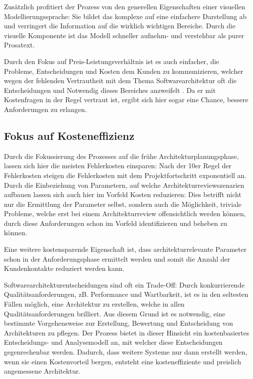 Zusätzlich profitiert der Prozess von den generellen Eigenschaften einer visuellen Modellierungssprache: Sie bildet das komplexe auf eine einfachere Darstellung ab und verringert die Information auf die wirklich wichtigen Bereiche. Durch die visuelle Komponente ist das Modell schneller aufnehm- und verstehbar als purer Prosatext.

Durch den Fokus auf Preis-Leistungsverhältnis ist es auch einfacher, die Probleme, Entscheidungen und Kosten dem Kunden zu kommunizieren, welcher wegen der fehlenden Vertrautheit mit dem Thema Softwarearchitektur oft die Entscheidungen und Notwendig dieses Bereiches anzweifelt \cite[S. 8-9]{softarch}. Da er mit Kostenfragen in der Regel vertraut ist, ergibt sich hier sogar eine Chance, bessere Anforderungen zu erlangen.

\subsection{Fokus auf Kosteneffizienz}
Durch die Fokussierung des Prozesses auf die frühe Architekturplanungsphase, lassen sich hier die meisten Fehlerkosten einsparen: Nach der 10er Regel der Fehlerkosten steigen die Fehlerkosten mit dem Projektfortschritt exponentiell an. Durch die Einbeziehung von Parametern, auf welche  Architekturreviewszenarien aufbauen lassen sich auch hier im Vorfeld Kosten reduzieren: Dies betrifft nicht nur die Ermittlung der Parameter selbst, sondern auch die Möglichkeit, triviale Probleme, welche erst bei einem Architekturreview offensichtlich werden können, durch diese Anforderungen schon im Vorfeld identifizieren und beheben zu können.

Eine weitere kostensparende Eigenschaft ist, dass architekturrelevante Parameter schon in der Anforderungsphase ermittelt werden und somit die Anzahl der Kundenkontakte reduziert werden kann.

Softwarearchitekturentscheidungen sind oft ein Trade-Off: Durch konkurrierende Qualitätsanforderungen, zB. Performance und Wartbarkeit, ist es in den seltesten Fällen möglich, eine Architektur zu erstellen, welche in allen Qualitätsanforderungen brilliert. Aus diesem Grund ist es notwendig, eine bestimmte Vorgehensweise zur Erstellung, Bewertung und Entscheidung von Architekturen zu pflegen. Der Prozess bietet in dieser Hinsicht ein kostenbasiertes Entscheidungs- und Analysemodell an, mit welcher diese Entscheidungen gegenrechenbar werden. Dadurch, dass weitere Systeme nur dann erstellt werden, wenn sie einen Kostenvorteil bergen, entsteht eine kosteneffiziente und preislich angemessene Architektur.

